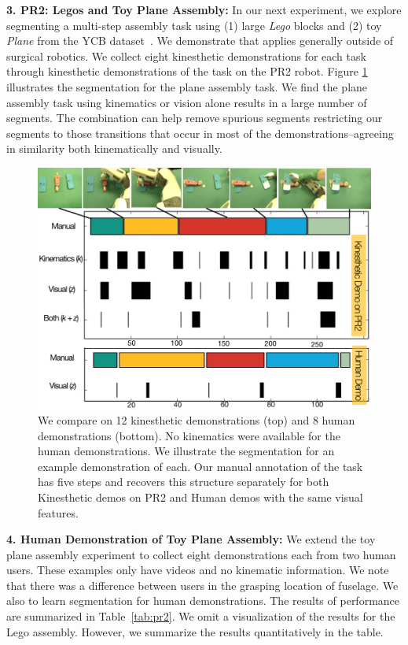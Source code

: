 \vspace{5pt}
\noindent \textbf{3. PR2: Legos and Toy Plane Assembly: }
In our next experiment, we explore segmenting a multi-step assembly task using (1) large \textit{Lego} blocks and (2) toy \textit{Plane} from the YCB dataset~\cite{calli2015corr}. 
We demonstrate that \tsc applies generally outside of surgical robotics.
We collect eight kinesthetic demonstrations for each task through kinesthetic demonstrations of the task on the PR2 robot.
Figure \ref{pr2toyplane} illustrates the segmentation for the plane assembly task.
We find the plane assembly task using kinematics or vision alone results in a large number of segments.
The combination can help remove spurious segments restricting our segments to those transitions that occur in most of the demonstrations--agreeing in similarity both kinematically and visually.


\begin{figure}[!t]
\centering
\includegraphics[width=\linewidth]{tsc-experiments/pr2_plane_assembly-v5}
\caption{We compare \tsc on 12 kinesthetic demonstrations (top) and
8 human demonstrations (bottom).
No kinematics were available for the human demonstrations.
We illustrate the segmentation for an example demonstration of each.
Our manual annotation of the task has five steps and \tsc recovers this structure separately for both Kinesthetic demos on PR2 and Human demos with the same visual features. \label{pr2toyplane}}
\end{figure}

\vspace{5pt}
\noindent \textbf{4. Human Demonstration of Toy Plane Assembly: }
We extend the toy plane assembly experiment to collect eight demonstrations each from two human users. These examples only have videos and no kinematic information. We note that there was a difference between users in the grasping location of fuselage. 
 We also \TSC to learn segmentation for human demonstrations.
The results of \tsc performance are summarized in Table~\ref{tab:pr2}.
We omit a visualization of the results for the Lego assembly. However, we summarize the results quantitatively in the table.

